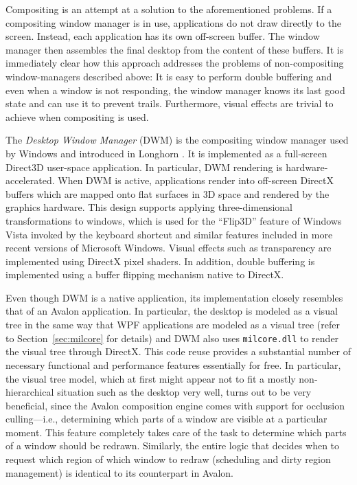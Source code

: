 			Compositing is an attempt at a solution to the aforementioned
			problems.  If a compositing window manager is in use, applications
			do not draw directly to the screen. Instead, each application has
			its own off-screen buffer. The
			window manager then assembles the final
			desktop from the content of these buffers. It is immediately clear how this approach addresses the
			problems of non-compositing window-managers described above: It is
			easy to perform double buffering and even when a window is not
			responding, the window manager knows its last good state and can
			use it to prevent trails. Furthermore, visual effects are trivial
			to achieve when compositing is used. \cite{dwmoverview}

		\label{sec:dwm}
			The \emph{Desktop Window Manager} (DWM) is the compositing window
			manager used by Windows and introduced in Longhorn
			\cite{dwmoverview}. It is implemented as a full-screen Direct3D
			user-space application. In particular, DWM rendering is
			hardware-accelerated. When DWM is active, applications render into
			off-screen DirectX buffers which are mapped onto flat surfaces in
			3D space and rendered by the graphics hardware. This design supports
			applying three-dimensional transformations to windows,
			which is used for the
			\enquote{Flip3D} feature of Windows Vista invoked by the keyboard
			shortcut  and similar features included in more
			recent versions of Microsoft Windows. Visual effects such as
			transparency are implemented using DirectX pixel shaders. In addition,
			double buffering is implemented using a buffer flipping mechanism
			native to DirectX.
			\cite{dwmdirectx}

			Even though DWM is a native application, its implementation closely
			resembles that of an Avalon application. In particular, the desktop
			is modeled as a visual tree in the same way that WPF applications
			are modeled as a visual tree (refer to Section~\ref{sec:milcore}
			for details) and DWM also uses \texttt{milcore.dll} to render the
			visual tree through DirectX. This code reuse provides a
			substantial number of necessary functional and performance
			features essentially for free.  In particular, the visual tree
			model, which at first might appear not to fit a mostly
			non-hierarchical situation such as the desktop very well,
			turns out to be very beneficial, since the Avalon composition
			engine comes with support for occlusion culling---i.e.,
			determining which parts of a window are visible at a particular
			moment. This feature completely takes care of the task to
			determine which parts of a window should be redrawn. Similarly, the
			entire logic that decides when to request which region of which window
			to redraw (scheduling and dirty region management) is identical to
			its counterpart in Avalon.
			\cite{dwmwpf}

